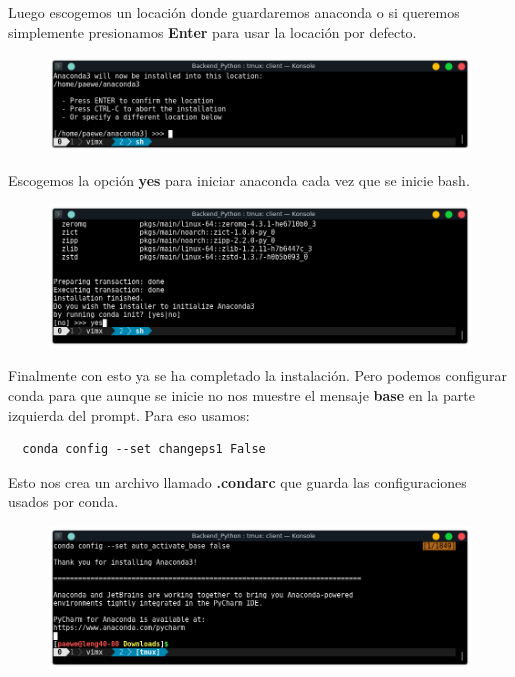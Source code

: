 \documentclass{article}
\begin{document}
Luego escogemos un locación donde guardaremos anaconda o si queremos
simplemente presionamos \textbf{Enter} para usar la locación por defecto.

\begin{figure}[h!]
  \centering
  \includegraphics[scale=0.75]{./Pictures/006_install_location.png}
\end{figure}

Escogemos la opción \textbf{yes} para iniciar anaconda cada vez que se inicie
bash.

\begin{figure}[h!]
  \centering
  \includegraphics[scale=0.75]{./Pictures/007_iniciar_bash.png}
\end{figure}

Finalmente con esto ya se ha completado la instalación. Pero podemos configurar conda para que aunque se inicie no nos muestre el mensaje \textbf{base} en la parte izquierda del prompt. Para eso usamos:

\begin{verbatim}
  conda config --set changeps1 False
\end{verbatim}

Esto nos crea un archivo llamado \textbf{.condarc} que guarda las
configuraciones usados por conda.

\newpage

\begin{figure}[h!]
  \centering
  \includegraphics[scale=0.75]{./Pictures/008_instalacion_finalizada.png}
\end{figure}
\end{document}
